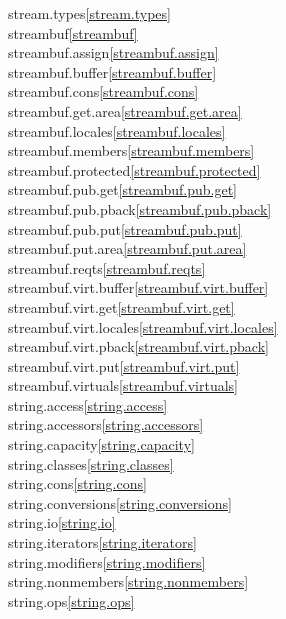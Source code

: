 \begin{multicols}{2}
stream.types\quad\ref{stream.types}\\
streambuf\quad\ref{streambuf}\\
streambuf.assign\quad\ref{streambuf.assign}\\
streambuf.buffer\quad\ref{streambuf.buffer}\\
streambuf.cons\quad\ref{streambuf.cons}\\
streambuf.get.area\quad\ref{streambuf.get.area}\\
streambuf.locales\quad\ref{streambuf.locales}\\
streambuf.members\quad\ref{streambuf.members}\\
streambuf.protected\quad\ref{streambuf.protected}\\
streambuf.pub.get\quad\ref{streambuf.pub.get}\\
streambuf.pub.pback\quad\ref{streambuf.pub.pback}\\
streambuf.pub.put\quad\ref{streambuf.pub.put}\\
streambuf.put.area\quad\ref{streambuf.put.area}\\
streambuf.reqts\quad\ref{streambuf.reqts}\\
streambuf.virt.buffer\quad\ref{streambuf.virt.buffer}\\
streambuf.virt.get\quad\ref{streambuf.virt.get}\\
streambuf.virt.locales\quad\ref{streambuf.virt.locales}\\
streambuf.virt.pback\quad\ref{streambuf.virt.pback}\\
streambuf.virt.put\quad\ref{streambuf.virt.put}\\
streambuf.virtuals\quad\ref{streambuf.virtuals}\\
string.access\quad\ref{string.access}\\
string.accessors\quad\ref{string.accessors}\\
string.capacity\quad\ref{string.capacity}\\
string.classes\quad\ref{string.classes}\\
string.cons\quad\ref{string.cons}\\
string.conversions\quad\ref{string.conversions}\\
string.io\quad\ref{string.io}\\
string.iterators\quad\ref{string.iterators}\\
string.modifiers\quad\ref{string.modifiers}\\
string.nonmembers\quad\ref{string.nonmembers}\\
string.ops\quad\ref{string.ops}\\

\end{multicols}
